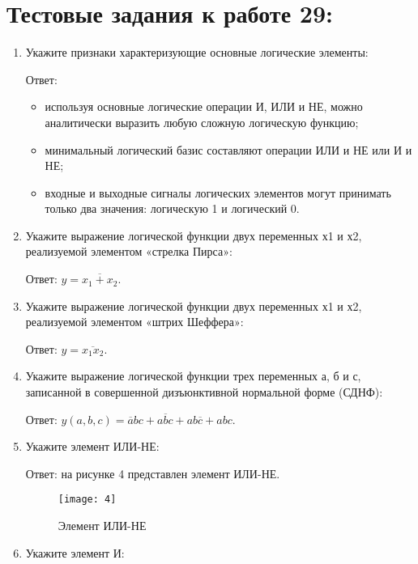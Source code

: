 \documentclass[spec, och, labwork]{shiza}
\begin{document}
\section{Тестовые задания к работе 29:}

\begin{enumerate}
    \item Укажите признаки характеризующие основные логические элементы:
    
    Ответ:
    \begin{itemize}
        \item используя основные логические операции И, ИЛИ и НЕ, можно аналитически
        выразить любую сложную логическую функцию;
        \item минимальный логический базис составляют операции ИЛИ и НЕ или И и НЕ;
        \item входные и выходные сигналы логических элементов могут принимать только
        два значения: логическую 1 и логический 0.
    \end{itemize}

    \item Укажите выражение логической функции двух переменных х1 и х2, реализуемой элементом «стрелка Пирса»:
    
    Ответ: $y = \overline{x_1 + x_2}$.

    \item Укажите выражение логической функции двух переменных х1 и х2, реализуемой элементом «штрих Шеффера»:
    
    Ответ: $y = \overline{x_1x_2}$.

    \item Укажите выражение логической функции трех переменных а, б и с, записанной
    в совершенной дизъюнктивной нормальной форме (СДНФ):

    Ответ: $y(a, b, c) = \overline{a}bc + a\overline{b}c + ab\overline{c} + abc$.

    \item Укажите элемент ИЛИ-НЕ:
    
    Ответ: на рисунке 4 представлен элемент ИЛИ-НЕ.

    \begin{figure}[H]
        \centering      %
        \texttt{[image: 4]}
        \caption{Элемент ИЛИ-НЕ}
        \label{fig:image1}
    \end{figure}

    \item Укажите элемент И:
    

\end{enumerate}
\end{document}
